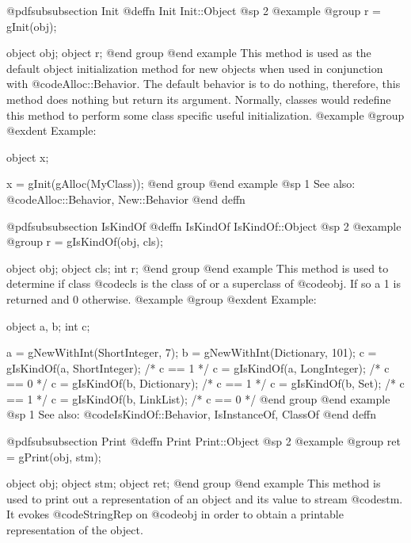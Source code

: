 @pdfsubsubsection {Init}
@deffn {Init} Init::Object
@sp 2
@example
@group
r = gInit(obj);

object  obj;
object  r;
@end group
@end example
This method is used as the default object initialization method for new
objects when used in conjunction with @code{Alloc::Behavior}.  The
default behavior is to do nothing, therefore, this method does nothing
but return its argument.  Normally, classes would redefine this method
to perform some class specific useful initialization.
@example
@group
@exdent Example:

object  x;

x = gInit(gAlloc(MyClass));
@end group
@end example
@sp 1
See also:  @code{Alloc::Behavior, New::Behavior}
@end deffn














@pdfsubsubsection {IsKindOf}
@deffn {IsKindOf} IsKindOf::Object
@sp 2
@example
@group
r = gIsKindOf(obj, cls);

object  obj;
object  cls;
int     r;
@end group
@end example
This method is used to determine if class @code{cls} is the class of
or a superclass of @code{obj}.  If so a 1 is returned and 0 otherwise.
@example
@group
@exdent Example:

object  a, b;
int     c;

a = gNewWithInt(ShortInteger, 7);
b = gNewWithInt(Dictionary, 101);
c = gIsKindOf(a, ShortInteger);  /* c == 1  */
c = gIsKindOf(a, LongInteger);   /* c == 0  */
c = gIsKindOf(b, Dictionary);    /* c == 1  */
c = gIsKindOf(b, Set);           /* c == 1  */
c = gIsKindOf(b, LinkList);      /* c == 0  */
@end group
@end example
@sp 1
See also:  @code{IsKindOf::Behavior, IsInstanceOf, ClassOf}
@end deffn












@pdfsubsubsection {Print}
@deffn {Print} Print::Object
@sp 2
@example
@group
ret = gPrint(obj, stm);

object  obj;
object  stm;
object  ret;
@end group
@end example
This method is used to print out a representation of an object
and its value to stream @code{stm}.  It evokes @code{StringRep}
on @code{obj} in order to obtain a printable representation of
the object.


